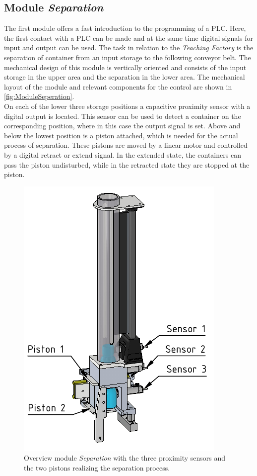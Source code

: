 \subsection{Module \textit{Separation}}
    The first module offers a fast introduction to the programming of a PLC. Here, the first contact with a PLC can be made and at the same time digital signals for input and output can be used. The task in relation to the \textit{Teaching Factory} is the separation of container from an input storage to the following conveyor belt. The mechanical design of this module is vertically oriented and consists of the input storage in the upper area and the separation in the lower area. The mechanical layout of the module and relevant components for the control are shown in \autoref{fig:ModuleSeperation}.\\
   
    On each of the lower three storage positions a capacitive proximity sensor with a digital output is located. This sensor can be used to detect a container on the corresponding position, where in this case the output signal is set. Above and below the lowest position is a piston attached, which is needed for the actual process of separation. These pistons are moved by a linear motor and controlled by a digital retract or extend signal. In the extended state, the containers can pass the piston undisturbed, while in the retracted state they are stopped at the piston. \\
	\begin{figure}[htp]
		\centering
		\includegraphics{figures/CadSeperation.pdf}	
		\caption[Overview module \textit{Separation}.]{Overview module \textit{Separation} with the three proximity sensors and the two pistons realizing the separation process.}
		\label{fig:ModuleSeperation}
	\end{figure}
	
